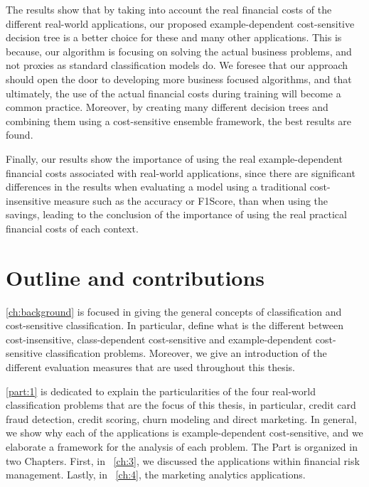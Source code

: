   The results show that by taking into account the real financial costs of the different 
  real-world applications, our  proposed example-dependent cost-sensitive decision tree is a better 
  choice for these and many other applications. This is because, our algorithm is focusing on 
  solving the actual business problems,  and not proxies as standard classification models do. We 
  foresee that our approach should open the door to developing more business focused algorithms, 
  and  that ultimately, the use of the actual financial costs during training will become a common 
  practice. Moreover, by creating many different decision trees and combining them using a 
  cost-sensitive ensemble framework, the best results are found.

  Finally, our results show the importance of using the real example-dependent financial costs 
  associated with real-world applications, since there are significant differences in the 
  results when evaluating a model using a traditional cost-insensitive measure such as the 
  accuracy or F1Score,  than when using the savings, leading to the conclusion of the 
  importance of using the real practical financial costs of each context.

\newpage
\section{Outline and contributions}

\chaptername{ \ref{ch:background}} is focused in giving the general concepts of classification 
and cost-sensitive classification. In particular, define what is the different between 
cost-insensitive, class-dependent cost-sensitive and example-dependent cost-sensitive 
classification problems. Moreover, we give an introduction of the different evaluation measures 
that are used throughout this thesis.

\partname{ \ref{part:1}} is dedicated to explain the particularities of the four real-world 
classification problems that are the focus of this thesis, in particular, credit card fraud 
detection, credit scoring, churn modeling and direct marketing. In general, we show why each of the 
applications is example-dependent cost-sensitive, and we elaborate a framework for the analysis of 
each problem. The Part is organized in two Chapters. First, in \chaptername{~\ref{ch:3}}, we 
discussed the applications within financial risk management. Lastly, in  
\chaptername{~\ref{ch:4}}, the marketing analytics applications.

